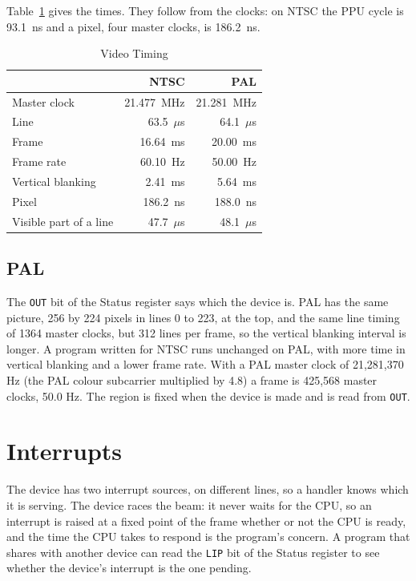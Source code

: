 Table~\ref{tab:times} gives the times. They follow from the clocks: on NTSC the PPU cycle is 93.1~ns and a pixel, four
master clocks, is 186.2~ns.

\begin{table}[H]
	\centering
	\begin{tabular}{lrr}
		\toprule
		                       & \textbf{NTSC} & \textbf{PAL} \\
		\midrule
		Master clock           & 21.477~MHz    & 21.281~MHz   \\
		Line                   & 63.5~$\mu$s   & 64.1~$\mu$s  \\
		Frame                  & 16.64~ms      & 20.00~ms     \\
		Frame rate             & 60.10~Hz      & 50.00~Hz     \\
		Vertical blanking      & 2.41~ms       & 5.64~ms      \\
		Pixel                  & 186.2~ns      & 188.0~ns     \\
		Visible part of a line & 47.7~$\mu$s   & 48.1~$\mu$s  \\
		\bottomrule
	\end{tabular}
	\caption{Video Timing}
	\label{tab:times}
\end{table}

\subsection{PAL}

The \texttt{OUT} bit of the Status register says which the device is. PAL has the same picture, 256 by 224 pixels in
lines 0 to 223, at the top, and the same line timing of 1364 master clocks, but 312 lines per frame, so the vertical
blanking interval is longer. A program written for NTSC runs unchanged on PAL, with more time in vertical blanking and
a lower frame rate. With a PAL master clock of 21,281,370 Hz (the PAL colour subcarrier multiplied by 4.8) a frame is
425,568 master clocks, 50.0 Hz. The region is fixed when the device is made and is read from \texttt{OUT}.

\section{Interrupts}
\label{sec:interrupts}

The device has two interrupt sources, on different lines, so a handler knows which it is serving. The device races the
beam: it never waits for the CPU, so an interrupt is raised at a fixed point of the frame whether or not the CPU is
ready, and the time the CPU takes to respond is the program's concern. A program that shares  with
another device can read the \texttt{LIP} bit of the Status register to see whether the device's interrupt is the one
pending.

